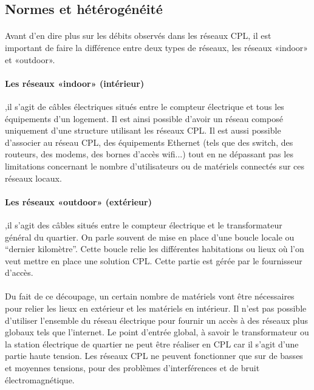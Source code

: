         \subsection{Normes et hétérogénéité}
            \paragraph{}
Avant d’en dire plus sur les débits observés dans les réseaux CPL, il est important de faire la différence entre deux types de réseaux,
les réseaux «indoor» et «outdoor».
            \paragraph{Les réseaux «indoor» (intérieur)}
,il s'agit de câbles électriques situés entre le compteur électrique et tous les équipements d’un logement.
Il est ainsi possible d'avoir un réseau composé uniquement d'une structure utilisant les réseaux CPL.
Il est aussi possible d'associer au réseau CPL, des équipements Ethernet (tels que des switch, des routeurs, des modems, des bornes d'accès wifi...)
tout en ne dépassant pas les limitations concernant le nombre d'utilisateurs ou de matériels connectés sur ces réseaux locaux.
            \paragraph{Les réseaux «outdoor» (extérieur)}
,il s'agit des câbles situés entre le compteur électrique et le transformateur général du quartier.
On parle souvent de mise en place d’une boucle locale ou “dernier kilomètre”.
Cette boucle relie les différentes habitations ou lieux où l'on veut mettre en place une solution CPL.
Cette partie est gérée par le fournisseur d'accès.
            \paragraph{}
Du fait de ce découpage, un certain nombre de matériels vont être nécessaires pour relier les lieux en extérieur et les matériels en intérieur.
Il n'est pas possible d'utiliser l'ensemble du réseau électrique pour fournir un accès à des réseaux plus globaux tels que l’internet.
Le point d'entrée global, à savoir le transformateur ou la station électrique de quartier ne peut être réaliser en CPL car il s'agit d'une partie haute tension.
Les réseaux CPL ne peuvent fonctionner que sur de basses et moyennes tensions, pour des problèmes d'interférences et de bruit électromagnétique.
